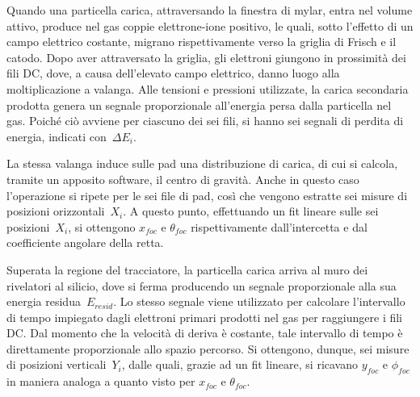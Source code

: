 Quando una particella carica, attraversando la finestra di mylar, entra nel volume attivo, produce nel gas coppie elettrone-ione positivo, le quali, sotto l'effetto di un campo elettrico costante, migrano rispettivamente verso la griglia di Frisch e il catodo. 
Dopo aver attraversato la griglia, gli elettroni giungono in prossimità dei fili DC, dove, a causa dell'elevato campo elettrico, danno luogo alla moltiplicazione a valanga. 
Alle tensioni e pressioni utilizzate, la carica secondaria prodotta genera un segnale proporzionale all'energia persa dalla particella nel gas. 
Poiché ciò avviene per ciascuno dei sei fili, si hanno sei segnali di perdita di energia, indicati con~$\Delta E_i$.

La stessa valanga induce sulle pad una distribuzione di carica, di cui si calcola, tramite un apposito software, il centro di gravità. Anche in questo caso l'operazione si ripete per le sei file di pad, così che vengono estratte sei misure di posizioni orizzontali~$X_i$.
A questo punto, effettuando un fit lineare sulle sei posizioni~$X_i$, si ottengono $x_{foc}$ e $\theta_{foc}$ rispettivamente dall'intercetta e dal coefficiente angolare della retta.

Superata la regione del tracciatore, la particella carica arriva al muro dei rivelatori al silicio, dove si ferma producendo un segnale proporzionale alla sua energia residua~$E_{resid}$. 
Lo stesso segnale viene utilizzato per calcolare l'intervallo di tempo impiegato dagli elettroni primari prodotti nel gas per raggiungere i fili DC. 
Dal momento che la velocità di deriva è costante, tale intervallo di tempo è direttamente proporzionale allo spazio percorso. Si ottengono, dunque, sei misure di posizioni verticali~$Y_i$, dalle quali, grazie ad un fit lineare, si ricavano $y_{foc}$ e $\phi_{foc}$ in maniera analoga a quanto visto per $x_{foc}$ e $\theta_{foc}$.

